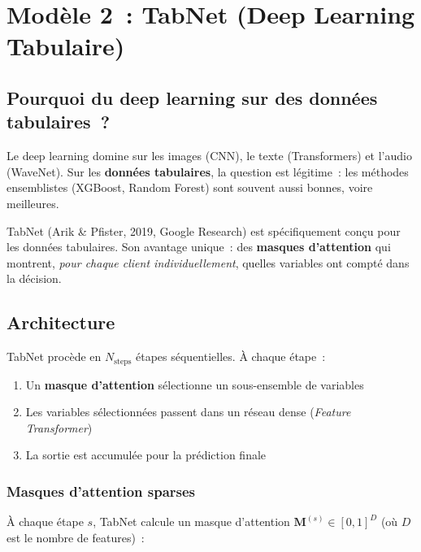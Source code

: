 \documentclass[12pt,a4paper]{article}
\begin{document}
\section{Mod\`ele 2~: TabNet (Deep Learning Tabulaire)}
\label{sec:tabnet}

\subsection{Pourquoi du deep learning sur des donn\'ees tabulaires~?}

Le deep learning domine sur les images (CNN), le texte (Transformers) et l'audio (WaveNet). Sur les \textbf{donn\'ees tabulaires}, la question est l\'egitime~: les m\'ethodes ensemblistes (XGBoost, Random Forest) sont souvent aussi bonnes, voire meilleures.

TabNet (Arik \& Pfister, 2019, Google Research) est sp\'ecifiquement con\c{c}u pour les donn\'ees tabulaires. Son avantage unique~: des \textbf{masques d'attention} qui montrent, \textit{pour chaque client individuellement}, quelles variables ont compt\'e dans la d\'ecision.

\subsection{Architecture}

\begin{definitionbox}
TabNet proc\`ede en $N_{\text{steps}}$ \'etapes s\'equentielles. \`A chaque \'etape~:
\begin{enumerate}[noitemsep]
    \item Un \textbf{masque d'attention} s\'electionne un sous-ensemble de variables
    \item Les variables s\'electionn\'ees passent dans un r\'eseau dense (\textit{Feature Transformer})
    \item La sortie est accumul\'ee pour la pr\'ediction finale
\end{enumerate}
\end{definitionbox}

\subsubsection{Masques d'attention sparses}

\`A chaque \'etape $s$, TabNet calcule un masque d'attention $\mathbf{M}^{(s)} \in [0, 1]^D$ (o\`u $D$ est le nombre de features)~:
\end{document}
